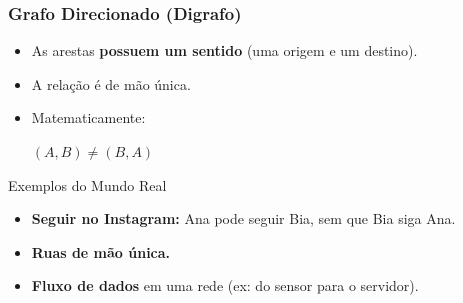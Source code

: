 \documentclass[9pt]{beamer}
\begin{document}
\begin{frame}
    \frametitle{Grafo Direcionado (Digrafo)}
    \begin{itemize}
        \item As arestas \textbf{possuem um sentido} (uma origem e um destino).
        \item A relação é de mão única.
        \item Matematicamente:
        \begin{center}
            \Large $(A, B) \neq (B, A)$
        \end{center}
    \end{itemize}
    \vspace{0.5cm}
    \begin{block}{Exemplos do Mundo Real}
        \begin{itemize}
            \item \textbf{Seguir no Instagram:} Ana pode seguir Bia, sem que Bia siga Ana.
            \item \textbf{Ruas de mão única.}
            \item \textbf{Fluxo de dados} em uma rede (ex: do sensor para o servidor).
        \end{itemize}
    \end{block}
\end{frame}
\end{document}
